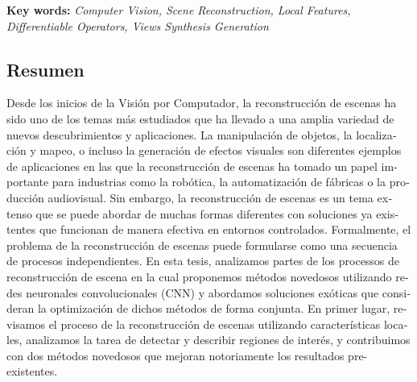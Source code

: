 \vspace{1mm}
\textbf{Key words:} \textit{Computer Vision, Scene Reconstruction, Local Features, Differentiable Operators, Views Synthesis Generation}


\begin{otherlanguage}{spanish}
\chapter*{Resumen}

\vspace{-24mm}

Desde los inicios de la Visión por Computador, la reconstrucción de escenas ha sido uno de los temas más estudiados que ha llevado a una amplia variedad de nuevos descubrimientos y aplicaciones. La manipulación de objetos, la localización y mapeo, o incluso la generación de efectos visuales son diferentes ejemplos de aplicaciones en las que la reconstrucción de escenas ha tomado un papel importante para industrias como la robótica, la automatización de fábricas o la producción audiovisual. Sin embargo, la reconstrucción de escenas es un tema extenso que se puede abordar de muchas formas diferentes con soluciones ya existentes que funcionan de manera efectiva en entornos controlados. Formalmente, el problema de la reconstrucción de escenas puede formularse como una secuencia de procesos independientes. En esta tesis, analizamos partes de los processos de reconstrucción de escena en la cual proponemos métodos novedosos utilizando redes neuronales convolucionales (CNN) y abordamos soluciones exóticas que consideran la optimización de dichos métodos de forma conjunta. En primer lugar, revisamos el proceso de la reconstrucción de escenas utilizando características locales, analizamos la tarea de detectar y describir regiones de interés, y contribuimos con dos métodos novedosos que mejoran notoriamente los resultados pre-existentes.


\end{otherlanguage}
